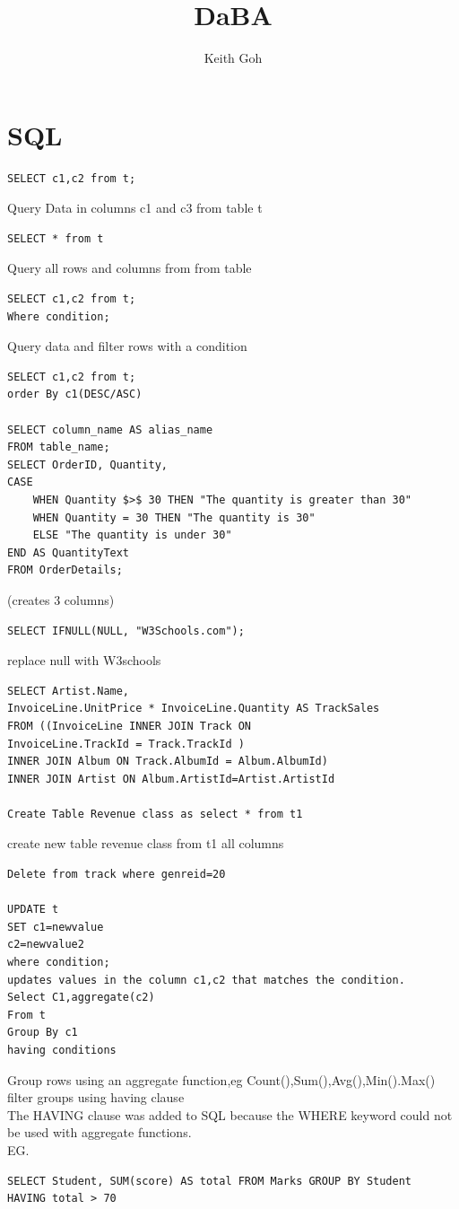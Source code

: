 \documentclass{article}
\title{DaBA}
\author{Keith Goh}
\begin{document}
\maketitle
\section{SQL}
\begin{verbatim}
SELECT c1,c2 from t;
\end{verbatim}
Query Data in columns c1 and c3 from table t\\
\begin{verbatim}
SELECT * from t
\end{verbatim}
Query all rows and columns from from table\\
\begin{verbatim}
SELECT c1,c2 from t;
Where condition;
\end{verbatim}
Query data and filter rows with a condition\\
\begin{verbatim}
SELECT c1,c2 from t;
order By c1(DESC/ASC)

SELECT column_name AS alias_name
FROM table_name;
SELECT OrderID, Quantity,
CASE
    WHEN Quantity $>$ 30 THEN "The quantity is greater than 30"
    WHEN Quantity = 30 THEN "The quantity is 30"
    ELSE "The quantity is under 30"
END AS QuantityText
FROM OrderDetails;
\end{verbatim}
(creates 3 columns)
\begin{verbatim}
SELECT IFNULL(NULL, "W3Schools.com");
\end{verbatim}
replace null with W3schools\\
\begin{verbatim}
SELECT Artist.Name,
InvoiceLine.UnitPrice * InvoiceLine.Quantity AS TrackSales
FROM ((InvoiceLine INNER JOIN Track ON
InvoiceLine.TrackId = Track.TrackId )
INNER JOIN Album ON Track.AlbumId = Album.AlbumId)
INNER JOIN Artist ON Album.ArtistId=Artist.ArtistId

Create Table Revenue class as select * from t1
\end{verbatim}
create new table revenue class from t1 all columns
\begin{verbatim}
Delete from track where genreid=20

UPDATE t
SET c1=newvalue
c2=newvalue2
where condition;
updates values in the column c1,c2 that matches the condition.
Select C1,aggregate(c2)
From t
Group By c1
having conditions
\end{verbatim}
Group rows using an aggregate function,eg Count(),Sum(),Avg(),Min().Max()\\
filter groups using having clause\\
The HAVING clause was added to SQL because the WHERE keyword could not be used with aggregate functions.\\
EG.
\begin{verbatim}
SELECT Student, SUM(score) AS total FROM Marks GROUP BY Student
HAVING total > 70
\end{verbatim}
\end{document}
